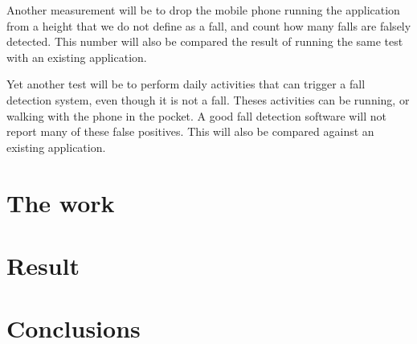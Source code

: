 \documentclass[11pt, a4paper, onecolumn]{article}
\begin{document}
Another measurement will be to drop the mobile phone running the application from a height that we do not define as a fall, and count how many falls are falsely detected. This number will also be compared the result of running the same test with an existing application.

Yet another test will be to perform daily activities that can trigger a fall detection system, even though it is not a fall. Theses activities can be running, or walking with the phone in the pocket. A good fall detection software will not report many of these false positives. This will also be compared against an existing application.


	   
	\newpage
	
	
	
	\section{The work}
	\newpage
	
	\section{Result}
	\newpage
	
	\section{Conclusions}
	\newpage
	
	
\end{document}
